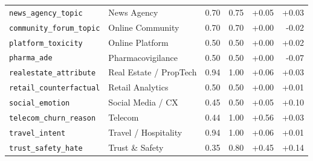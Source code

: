 \begin{tabular}{llrrrr}
\texttt{news\_agency\_topic} & News Agency & 0.70 & 0.75 & +0.05 & +0.03 \\
\texttt{community\_forum\_topic} & Online Community & 0.70 & 0.70 & +0.00 & -0.02 \\
\texttt{platform\_toxicity} & Online Platform & 0.50 & 0.50 & +0.00 & +0.02 \\
\texttt{pharma\_ade} & Pharmacovigilance & 0.50 & 0.50 & +0.00 & -0.07 \\
\texttt{realestate\_attribute} & Real Estate / PropTech & 0.94 & 1.00 & +0.06 & +0.03 \\
\texttt{retail\_counterfactual} & Retail Analytics & 0.50 & 0.50 & +0.00 & +0.01 \\
\texttt{social\_emotion} & Social Media / CX & 0.45 & 0.50 & +0.05 & +0.10 \\
\texttt{telecom\_churn\_reason} & Telecom & 0.44 & 1.00 & +0.56 & +0.03 \\
\texttt{travel\_intent} & Travel / Hospitality & 0.94 & 1.00 & +0.06 & +0.01 \\
\texttt{trust\_safety\_hate} & Trust \& Safety & 0.35 & 0.80 & +0.45 & +0.14 \\
\bottomrule
\end{tabular}